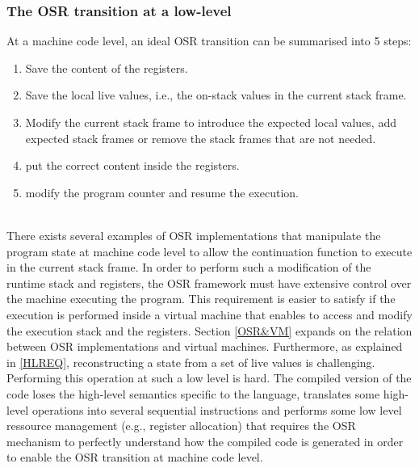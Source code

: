 \subsubsection{The OSR transition at a low-level}
At a machine code level, an ideal OSR transition can be summarised into 5 steps: 
\begin{enumerate}
    \item Save the content of the registers.
    \item Save the local live values, i.e., the on-stack values in the current stack frame.
    \item Modify the current stack frame to introduce the expected local values, add expected stack frames or remove the stack frames that are not needed.
    \item put the correct content inside the registers.
    \item modify the program counter and resume the execution.
\end{enumerate}\\

There exists several examples of OSR implementations that manipulate the program state at machine code level to allow the continuation function to execute in the current stack frame\cite{chambers1991making, holzle1992debugging, suganuma2006region}.
In order to perform such a modification of the runtime stack and registers, the OSR framework must have extensive control over the machine executing the program.
This requirement is easier to satisfy if the execution is performed inside a virtual machine that enables to access and modify the execution stack and the registers.
Section \ref{OSR&VM} expands on the relation between OSR implementations and virtual machines.
Furthermore, as explained in \ref{HLREQ}, reconstructing a state from a set of live values is challenging. 
Performing this operation at such a low level is hard.
The compiled version of the code loses the high-level semantics specific to the language, translates some high-level operations into several sequential instructions and performs some low level ressource management (e.g., register allocation) that requires the OSR mechanism to perfectly understand how the compiled code is generated in order to enable the OSR transition at machine code level.\\


